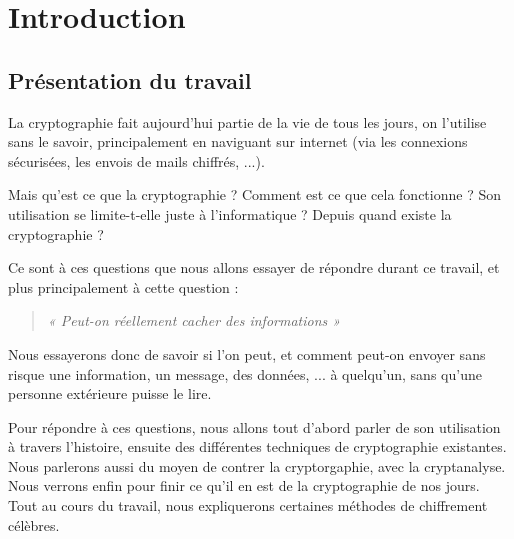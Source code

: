 \chapter{Introduction}

\section{Présentation du travail}
La cryptographie fait aujourd'hui partie de la vie de tous les jours,
on l'utilise sans le savoir, principalement en naviguant sur internet
(via les connexions sécurisées, les envois de mails chiffrés, ...).

Mais qu'est ce que la cryptographie ? Comment est ce que cela
fonctionne ? Son utilisation se limite-t-elle juste à l'informatique ?
Depuis quand existe la cryptographie ?

Ce sont à ces questions que nous allons essayer de répondre durant ce
travail, et plus principalement à cette question :

\begin{quote}
\emph{« Peut-on réellement cacher des informations »}
\end{quote}

Nous essayerons donc de savoir si l'on peut, et comment peut-on
envoyer sans risque une information, un message, des données, ... à
quelqu'un, sans qu'une personne extérieure puisse le lire.

Pour répondre à ces questions, nous allons tout d'abord parler de son
utilisation à travers l'histoire, ensuite des différentes techniques
de cryptographie existantes. Nous parlerons aussi du moyen de contrer
la cryptorgaphie, avec la cryptanalyse. Nous verrons enfin pour finir
ce qu'il en est de la cryptographie de nos jours.  Tout au cours du
travail, nous expliquerons certaines méthodes de chiffrement
célèbres.


